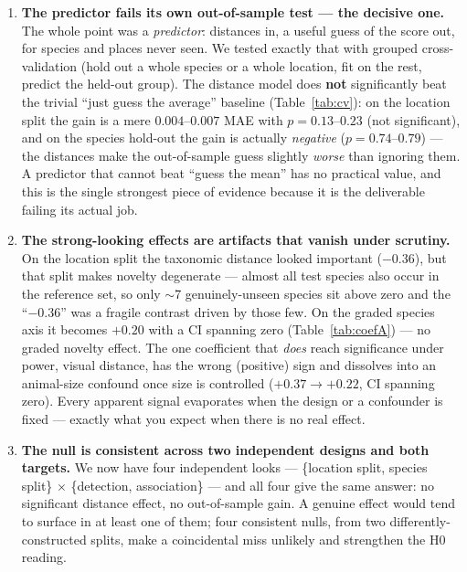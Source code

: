 \documentclass[11pt]{article}
\begin{document}
\begin{enumerate}[leftmargin=1.6em,itemsep=6pt]
  \item \textbf{The predictor fails its own out-of-sample test --- the decisive one.}
        The whole point was a \emph{predictor}: distances in, a useful guess of the score out, for
        species and places never seen. We tested exactly that with grouped cross-validation (hold out a
        whole species or a whole location, fit on the rest, predict the held-out group). The distance
        model does \textbf{not} significantly beat the trivial ``just guess the average'' baseline
        (Table~\ref{tab:cv}): on the location split the gain is a mere $0.004$--$0.007$ MAE with
        $p = 0.13$--$0.23$ (not significant), and on the species hold-out the gain is actually
        \emph{negative} ($p = 0.74$--$0.79$) --- the distances make the out-of-sample guess slightly
        \emph{worse} than ignoring them. A predictor that cannot beat ``guess the mean'' has no practical
        value, and this is the single strongest piece of evidence because it is the deliverable failing
        its actual job.

  \item \textbf{The strong-looking effects are artifacts that vanish under scrutiny.}
        On the location split the taxonomic distance looked important ($-0.36$), but that split makes
        novelty degenerate --- almost all test species also occur in the reference set, so only $\sim$7
        genuinely-unseen species sit above zero and the ``$-0.36$'' was a fragile contrast driven by those
        few. On the graded species axis it becomes $+0.20$ with a CI spanning zero (Table~\ref{tab:coefA})
        --- no graded novelty effect. The one coefficient that \emph{does} reach significance under power,
        visual distance, has the wrong (positive) sign and dissolves into an animal-size confound once size
        is controlled ($+0.37 \to +0.22$, CI spanning zero). Every apparent signal evaporates when the
        design or a confounder is fixed --- exactly what you expect when there is no real effect.

  \item \textbf{The null is consistent across two independent designs and both targets.}
        We now have four independent looks --- \{location split, species split\} $\times$ \{detection,
        association\} --- and all four give the same answer: no significant distance effect, no
        out-of-sample gain. A genuine effect would tend to surface in at least one of them; four
        consistent nulls, from two differently-constructed splits, make a coincidental miss unlikely and
        strengthen the H0 reading.
\end{enumerate}
\end{document}
